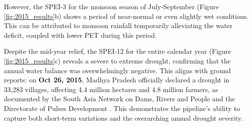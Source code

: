 \documentclass[12pt, a4paper]{article}
\begin{document}
However, the SPEI-3 for the monsoon season of July-September (Figure \ref{fig:2015_results}b) shows a period of near-normal or even slightly wet conditions. This can be attributed to monsoon rainfall temporarily alleviating the water deficit, coupled with lower PET during this period.

Despite the mid-year relief, the SPEI-12 for the entire calendar year (Figure \ref{fig:2015_results}c) reveals a severe to extreme drought, confirming that the annual water balance was overwhelmingly negative. This aligns with ground reports: on \textbf{Oct 26, 2015}, Madhya Pradesh officially declared a drought in 33,283 villages, affecting 4.4 million hectares and 4.8 million farmers, as documented by the South Asia Network on Dams, Rivers and People \cite{sandrp2015} and the Directorate of Pulses Development \cite{dpd2015}. This demonstrates the pipeline's ability to capture both short-term variations and the overarching annual drought severity.
\end{document}
